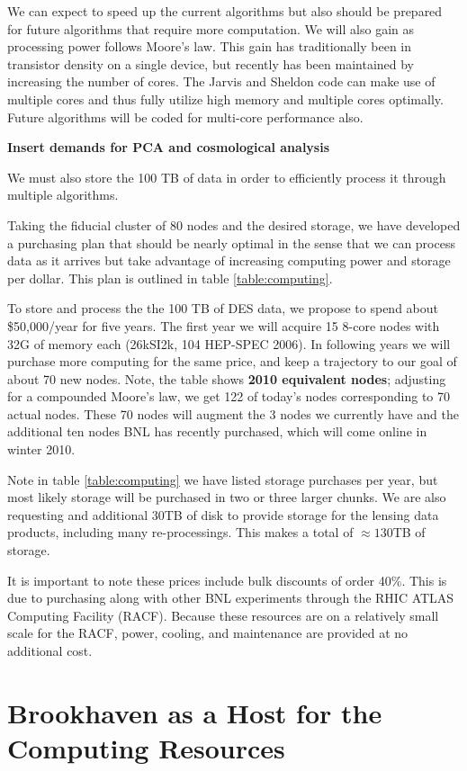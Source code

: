 \documentclass[12pt]{article}
\begin{document}
We can expect to speed up the current algorithms but also should be prepared
for future algorithms that require more computation.  We will also gain as
processing power follows Moore's law. This gain has traditionally been in
transistor density on a single device, but recently has been maintained by
increasing the number of cores.  The Jarvis and Sheldon code can make use of
multiple cores and thus fully utilize high memory and multiple cores optimally.
Future algorithms will be coded for multi-core performance also.

{\bf Insert demands for PCA and cosmological analysis}

We must also store the 100 TB of data in order to efficiently process it through
multiple algorithms.  

Taking the fiducial cluster of 80 nodes and the desired storage, we have
developed a purchasing plan that should be nearly optimal in the sense that
we can process data as it arrives but take advantage of increasing computing
power and storage per dollar.  This plan is outlined in table \ref{table:computing}.

To store and process the the 100 TB of DES data, we propose to spend about
\$50,000/year for five years. The first year we will acquire 15 8-core nodes
with 32G of memory each (26kSI2k, 104 HEP-SPEC 2006).  In following years we
will purchase more computing for the same price, and keep a trajectory to our
goal of about 70 new nodes.  Note, the table shows {\bf 2010 equivalent nodes};
adjusting for a compounded Moore's law, we get 122 of today's nodes
corresponding to 70 actual nodes.  These 70 nodes will augment the 3 nodes we
currently have and the additional ten nodes BNL has recently purchased, which
will come online in winter 2010.

Note in table \ref{table:computing} we have listed storage purchases per year,
but most likely storage will be purchased in two or three larger chunks.  We
are also requesting and additional 30TB of disk to provide storage for the
lensing data products, including many re-processings.  This makes a total
of $\approx 130$TB of storage.

It is important to note these prices include bulk discounts of order 40\%.
This is due to purchasing along with other BNL experiments through the RHIC
ATLAS Computing Facility (RACF).  Because these resources are on a relatively
small scale for the RACF, power, cooling, and maintenance are provided at no
additional cost.  


\section{Brookhaven as a Host for the Computing Resources}
\end{document}
